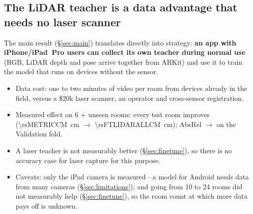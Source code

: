 \subsection{The LiDAR teacher is a data advantage that needs no laser scanner}
The main result (\S\ref{sec:main}) translates directly into strategy: \textbf{an app with iPhone/iPad~Pro users can
collect its own teacher during normal use} (RGB, LiDAR depth and pose arrive together from ARKit) and use it to train
the model that runs on devices without the sensor.
\begin{itemize}
\item Data cost: one to two minutes of video per room from devices already in the field, versus a \$20k laser
scanner, an operator and cross-sensor registration.
\item Measured effect on 6 $+$ \rsVN{} unseen rooms: every test room improves (\SI{\rsMETRICCM}{cm} $\rightarrow$
\SI{\rsFTLIDARALLCM}{cm}); AbsRel \rsVMETRICABSREL{} $\rightarrow$ \rsVFTALLABSREL{} on the Validation fold.
\item A laser teacher is not measurably better (\S\ref{sec:finetune}), so there is no accuracy case for laser capture
for this purpose.
\item Caveats: only the iPad camera is measured---a model for Android needs data from many cameras
(\S\ref{sec:limitations}); and going from 10 to 24 rooms did not measurably help (\S\ref{sec:finetune}), so the
room count at which more data pays off is unknown.
\end{itemize}

